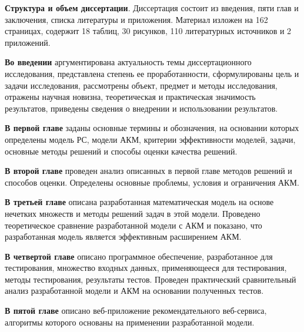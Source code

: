 {\bf Структура и объем диссертации}. Диссертация состоит из введения, пяти глав
и заключения, списка литературы и приложения. Материал изложен на 162
страницах, содержит 18 таблиц, 30 рисунков, 110 литературных источников и 2
приложений.

{\bf Во  введении} аргументирована  актуальность  темы  диссертационного
исследования, представлена степень ее проработанности, сформулированы цель и
задачи  исследования,  рассмотрены  объект,  предмет  и  методы  исследования,
отражены научная новизна, теоретическая и практическая значимость результатов,
приведены сведения о внедрении и использовании результатов.

{\bf В первой главе} заданы основные термины и обозначения, на основании
которых определены модель РС, модели АКМ, критерии эффективности
моделей, задачи, основные методы решений и способы оценки качества решений.

{\bf В второй главе} проведен анализ описанных в первой главе методов решений
и способов оценки. Определены основные проблемы, условия и ограничения АКМ.

{\bf В третьей главе} описана разработанная математическая модель на основе
нечетких множеств и методы решений задач в этой модели. Проведено теоретическое
сравнение разработанной модели с АКМ и показано, что разработанная модель
является эффективным расширением АКМ.


{\bf В четвертой главе} описано программное обеспечение, разработанное для
тестирования, множество входных данных, применяющееся для
тестирования, методы тестирования, результаты тестов. Проведен практический
сравнительный анализ разработанной модели и АКМ на основании полученных тестов.

{\bf В пятой главе} описано веб-приложение рекомендательного веб-сервиса,
алгоритмы которого основаны на применении разработанной модели.
